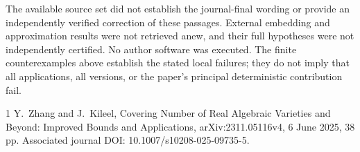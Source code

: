 \documentclass[10pt]{article}
\begin{document}
The available source set did not establish the journal-final wording or provide an independently verified correction of these passages. External embedding and approximation results were not retrieved anew, and their full hypotheses were not independently certified. No author software was executed. The finite counterexamples above establish the stated local failures; they do not imply that all applications, all versions, or the paper’s principal deterministic contribution fail.\par
1 Y. Zhang and J. Kileel, Covering Number of Real Algebraic Varieties and Beyond: Improved Bounds and Applications, arXiv:2311.05116v4, 6 June 2025, 38 pp. Associated journal DOI: 10.1007/s10208-025-09735-5.\par
\end{document}
